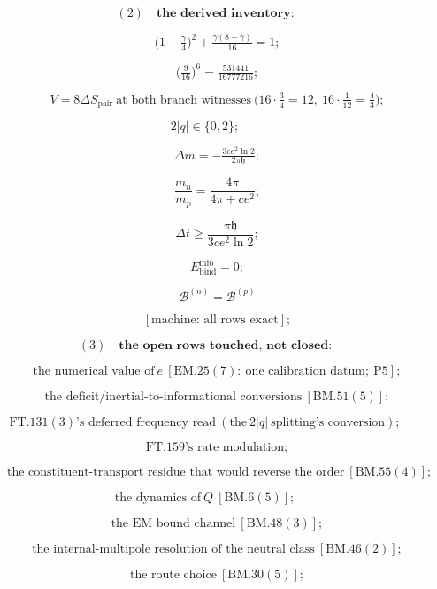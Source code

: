 \documentclass[11pt,openany]{report}
\theoremstyle{canonplain}
\theoremstyle{canondef}
\begin{document}
\[\]

\[
(2)\quad\textbf{the derived inventory:}
\]

\[
\qquad \bigl(1-\tfrac\gamma4\bigr)^2+\tfrac{\gamma(8-\gamma)}{16}=1;
\]

\[
\qquad \bigl(\tfrac9{16}\bigr)^6=\tfrac{531441}{16777216};
\]

\[
\qquad V=8\Delta S_{\mathrm{pair}}\ \text{at both branch witnesses}\ \bigl(16\cdot\tfrac34=12,\ 16\cdot\tfrac1{12}=\tfrac43\bigr);
\]

\[
2|q|\in\{0,2\};
\]

\[
\qquad \Delta m=-\tfrac{3ce^2\ln2}{2\pi\mathfrak h};
\]

\[
\qquad \frac{m_n}{m_p}=\frac{4\pi}{4\pi+ce^2};
\]

\[
\qquad \Delta t\ge\frac{\pi\mathfrak h}{3ce^2\ln2};
\]

\[
\qquad E^{\mathrm{info}}_{\mathrm{bind}}=0;
\]

\[
\qquad \mathcal B^{(n)}=\mathcal B^{(p)}
\]

\[
\qquad [\text{machine: all rows exact}];
\]

\[
(3)\quad\textbf{the open rows touched, not closed:}
\]

\[
\qquad \text{the numerical value of}\ e\ [\mathrm{EM.25}(7):\ \text{one calibration datum};\ \mathrm{P5}];
\]

\[
\qquad \text{the deficit/inertial-to-informational conversions}\ [\mathrm{BM.51}(5)];
\]

\[
\mathrm{FT.131}(3)\text{'s deferred frequency read}\ (\text{the}\ 2|q|\ \text{splitting's conversion});
\]

\[
\qquad \mathrm{FT.159}\text{'s rate modulation};
\]

\[
\qquad \text{the constituent-transport residue that would reverse the order}\ [\mathrm{BM.55}(4)];
\]

\[
\text{the dynamics of}\ Q\ [\mathrm{BM.6}(5)];
\]

\[
\qquad \text{the EM bound channel}\ [\mathrm{BM.48}(3)];
\]

\[
\qquad \text{the internal-multipole resolution of the neutral class}\ [\mathrm{BM.46}(2)];
\]

\[
\qquad \text{the route choice}\ [\mathrm{BM.30}(5)];
\]
\end{document}

